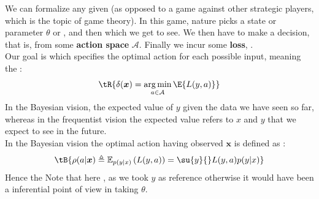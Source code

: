 We can formalize any given  (as 
opposed to a game against other strategic players, which is the topic of game theory).
In this game, nature picks a state or parameter $\theta$ or , and then  which we get to see. We
then have to make a decision, that is,  from some 
\textbf{action space} $\mathcal{A}$. Finally we incur some \textbf{loss}, .\\
Our goal is  which specifies the optimal
action for each possible input, meaning the :
$$ \tR{\delta(\bm{x}) = \argmin_{{a\in \mathcal{A}}} \E{{L(y, a)}}} $$
In the Bayesian vision, the expected value of $y$ given the data we have seen so far, 
whereas in the frequentist vision the expected value refers to $x$ and $y$ that we expect
to see in the future.\\
In the Bayesian vision the optimal action having observed $\bm{x}$ is defined as 
:
$$ \tB{\rho(a|\bm{x})\triangleq\mathbb{E}_{p(y|x)}\left(L(y, a)\right) = \su{y}{}L(y,
a) p(y|x)}$$
Hence the 
Note that here , as we took $y$ as reference otherwise it 
would have been a inferential point of view in taking $\theta$.

